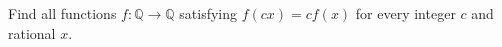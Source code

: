 Find all functions $f:\mathbb Q\to\mathbb Q$ satisfying $f(cx)=cf(x)$ for every integer $c$ and rational $x$.
